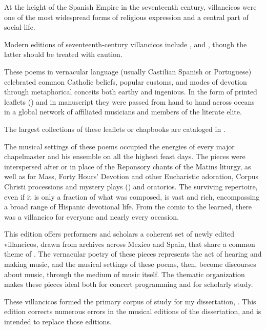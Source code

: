
At the height of the Spanish Empire in the seventeenth century,
villancicos were one of the most widespread forms of religious expression and a central part of social life.%
  \begin{Footnote}
  \autocites{Laird:VC}{Rubio:Forma}{Torrente:PhD}{Illari:Polychoral}
  {Knighton-Torrente:VCs}{Tenorio:SorJuana}{Cashner:Cards}

  Modern editions of seventeenth-century villancicos include \autocites{Ruimonte:Parnaso}{Fernandez:Cancionero}{RuizSamaniego:MME63}{Ezquerro:MME55}{Ezquerro:MME65}{Ezquerro:MME59}{Padilla:Tello}{Torrejon:VCs}, and \autocite{Stevenson:Christmas}, though the latter should be treated with caution.
  \end{Footnote}
These poems in vernacular language (usually Castilian Spanish or Portuguese) celebrated common Catholic beliefs, popular customs, and modes of devotion through metaphorical conceits both earthy and ingenious.
In the form of printed leaflets () and in manuscript they were passed from hand to hand across oceans in a global network of affiliated musicians and members of the literate elite.%
  \begin{Footnote}
  The largest collections of these leaflets or chapbooks are cataloged in \autocites{BNE:VCs17C}{BNE:VCs18C}{UK:VCs}{US:VCs}.
  \end{Footnote}

The musical settings of these poems occupied the energies of every major chapelmaster and his ensemble on all the highest feast days.
The pieces were interspersed after or in place of the Reponsory chants of the Matins liturgy, as well as for Mass, Forty Hours' Devotion and other Eucharistic adoration, Corpus Christi processions and mystery plays () and oratorios.
The surviving repertoire, even if it is only a fraction of what was composed, is vast and rich, encompassing a broad range of Hispanic devotional life.
From the comic to the learned, there was a villancico for everyone and nearly every occasion.

This edition offers performers and scholars a coherent set of newly edited villancicos, drawn from archives across Mexico and Spain, that share a common theme of .
The vernacular poetry of these pieces represents the act of hearing and making music, and the musical settings of these poems, then, become discourses about music, through the medium of music itself.
The thematic organization makes these pieces ideal both for concert programming and for scholarly study.%
  \begin{Footnote}
  These villancicos formed the primary corpus of study for my dissertation, \citemydiss.
  This edition corrects numerous errors in the musical editions of the dissertation, and is intended to replace those editions.
  \end{Footnote}

